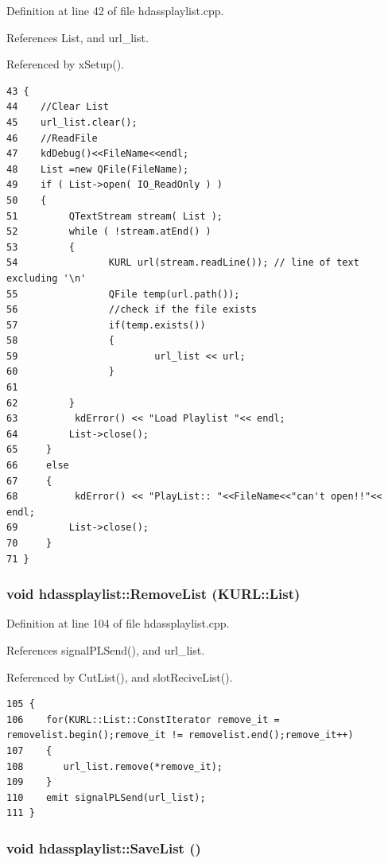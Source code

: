 Definition at line 42 of file hdassplaylist.cpp.

References List, and url\_\-list.

Referenced by x\-Setup().



\footnotesize\begin{verbatim}43 {
44    //Clear List
45    url_list.clear();
46    //ReadFile
47    kdDebug()<<FileName<<endl;
48    List =new QFile(FileName);
49    if ( List->open( IO_ReadOnly ) ) 
50    {
51         QTextStream stream( List );            
52         while ( !stream.atEnd() ) 
53         {
54                KURL url(stream.readLine()); // line of text excluding '\n'
55                QFile temp(url.path());
56                //check if the file exists
57                if(temp.exists())
58                {
59                        url_list << url;
60                }         
61              
62         }
63          kdError() << "Load Playlist "<< endl;
64         List->close();
65     }
66     else
67     {
68          kdError() << "PlayList:: "<<FileName<<"can't open!!"<< endl;
69         List->close();
70     }
71 }
\end{verbatim}\normalsize 
{}
\subsubsection{\setlength{\rightskip}{0pt plus 5cm}void hdassplaylist::Remove\-List (KURL::List)\hspace{0.3cm}{\tt  [private]}}\label{classhdassplaylist_hdassplaylistd0}




Definition at line 104 of file hdassplaylist.cpp.

References signal\-PLSend(), and url\_\-list.

Referenced by Cut\-List(), and slot\-Recive\-List().



\footnotesize\begin{verbatim}105 {
106    for(KURL::List::ConstIterator remove_it = removelist.begin();remove_it != removelist.end();remove_it++)
107    {
108       url_list.remove(*remove_it);
109    }
110    emit signalPLSend(url_list);
111 }
\end{verbatim}\normalsize 
{}
\subsubsection{\setlength{\rightskip}{0pt plus 5cm}void hdassplaylist::Save\-List ()\hspace{0.3cm}{\tt  [private]}}\label{classhdassplaylist_hdassplaylistd3}




